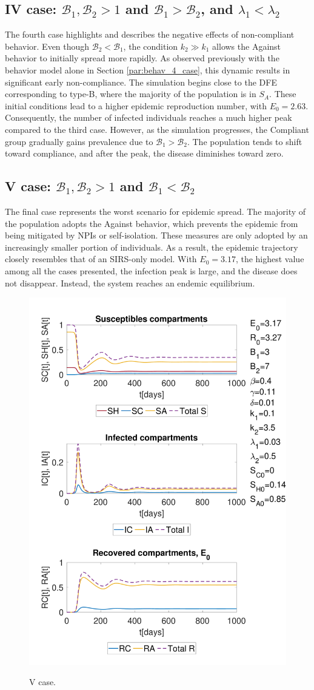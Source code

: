 \subsection{IV case:  $\mathcal{B}_1, \mathcal{B}_2 >1$ and $\mathcal{B}_1 >  \mathcal{B}_2$, and $\lambda_1 < \lambda_2$}
The fourth case highlights and describes the negative effects of non-compliant behavior. Even though $\mathcal{B}_2 <\mathcal{B}_1$, the condition $k_2 \gg k_1$ allows the Against behavior to initially spread more rapidly. As observed previously with the behavior model alone in Section \ref{par:behav_4_case}, this dynamic results in significant early non-compliance. The simulation begins close to the DFE corresponding to type-B, where the majority of the population is in $S_A$. These initial conditions lead to a higher epidemic reproduction number, with $E_0 = 2.63$. Consequently, the number of infected individuals reaches a much higher peak compared to the third case.
However, as the simulation progresses, the Compliant group gradually gains prevalence due to $\mathcal{B}_1 >\mathcal{B}_2$. The population tends to shift toward compliance, and after the peak, the disease diminishes toward zero.

\subsection{V case:  $\mathcal{B}_1, \mathcal{B}_2 >1$ and $\mathcal{B}_1 <  \mathcal{B}_2$}
The final case represents the worst scenario for epidemic spread. The majority of the population adopts the Against behavior, which prevents the epidemic from being mitigated by NPIs or self-isolation. These measures are only adopted by an increasingly smaller portion of individuals. As a result, the epidemic trajectory closely resembles that of an SIRS-only model. With $E_0 = 3.17$, the highest value among all the cases presented, the infection peak is large, and the disease does not disappear. Instead, the system reaches an endemic equilibrium.

\begin{figure}[h]
	\centering
	{\includegraphics[width=0.5\linewidth]{1_corpo/figure/behav_epi_sim/E_0_model_3epi_behav_sim_B2_mag_B1}} 
	\caption[Full model simulation figure third]{V case.}
	\label{fig:sim_B1_less_B2}
\end{figure}

